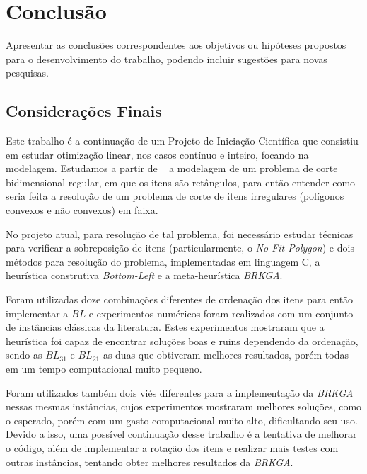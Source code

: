 \chapter{Conclusão}
Apresentar as conclusões correspondentes aos objetivos ou hipóteses propostos para o desenvolvimento do trabalho, podendo incluir sugestões para novas pesquisas.

\section{Considerações Finais} \label{sec:cons_finais}

Este trabalho é a continuação de um Projeto de Iniciação Científica que consistiu em estudar otimização linear, nos casos contínuo e inteiro, focando na modelagem. 
Estudamos a partir de ~\cite{arenales} a modelagem de um problema de corte bidimensional regular, em que os itens são retângulos, para então entender como seria feita a resolução de um problema de corte de itens irregulares (polígonos convexos e não convexos) em faixa. 

No projeto atual, para resolução de tal problema, foi necessário estudar técnicas para verificar a sobreposição de itens (particularmente, o \textit{No-Fit Polygon}) e dois métodos para resolução do problema, implementadas em linguagem C, a heurística construtiva \textit{Bottom-Left} e a meta-heurística \textit{BRKGA}. 

Foram utilizadas doze combinações diferentes de ordenação dos itens para então implementar a $BL$ e experimentos numéricos foram realizados com um conjunto de instâncias clássicas da literatura. 
Estes experimentos mostraram que a heurística foi capaz de encontrar soluções boas e ruins dependendo da ordenação, sendo as $BL_{31}$ e $BL_{21}$ as duas que obtiveram melhores resultados, porém todas em um tempo computacional muito pequeno. 

Foram utilizados também dois viés diferentes para a implementação da \textit{BRKGA} nessas mesmas instâncias, cujos experimentos mostraram melhores soluções, como o esperado, porém com um gasto computacional muito alto, dificultando seu uso. 
Devido a isso, uma possível continuação desse trabalho é a tentativa de melhorar o código, além de implementar a rotação dos itens e realizar mais testes com outras instâncias, tentando obter melhores resultados da \textit{BRKGA}.